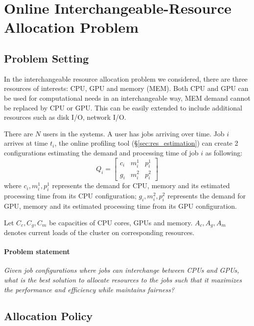 \section{Online Interchangeable-Resource Allocation Problem}

\subsection{Problem Setting}


In the interchangeable resource allocation problem we considered, there are three resources of interests: CPU, GPU and memory (MEM).
Both CPU and GPU can be used for computational needs in an interchangeable way, MEM demand cannot be replaced by CPU or GPU.
This can be easily extended to include additional resources such as disk I/O, network I/O.

There are $N$ users in the systems. A user has jobs arriving over time.
Job $i$ arrives at time $t_i$, the online profiling tool (\S\ref{sec:res_estimation}) can create 2 configurations estimating the demand and processing time of job $i$ as following: $$
Q_i=
\begin{bmatrix} 
c_i & m_i^1 & p_i^1 \\
g_i & m_i^2 & p_i^2 
\end{bmatrix} $$ where $c_i, m_i^1, p_i^1$ represents the demand for CPU, memory and its estimated processing time from its CPU configuration; $g_i, m_i^2, p_i^2$ represents the demand for GPU, memory and its estimated processing time from its GPU configuration.

Let $C_c, C_g, C_m$ be capacities of CPU cores, GPUs and memory.
$A_c, A_g, A_m$ denotes current loads of the cluster on corresponding resources.

\paragraph{Problem statement} \emph{Given job configurations where jobs can interchange between CPUs and GPUs,
what is the best solution to allocate resources to the jobs such that it maximizes the performance and efficiency while maintains fairness?}


\subsection{Allocation Policy}

